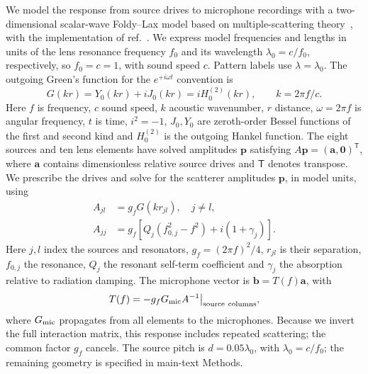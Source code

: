 \documentclass[pdflatex,sn-nature]{sn-jnl}%
\begin{document}
We model the response from source drives to microphone recordings with a two-dimensional scalar-wave Foldy--Lax model based on multiple-scattering theory~\cite{foldy1945,lax1951}, with the implementation of ref.~\cite{orazbayev2020}.
We express model frequencies and lengths in units of the lens resonance frequency
$f_0$ and its wavelength $\lambda_0=c/f_0$, respectively, so $f_0=c=1$, with sound speed $c$. Pattern labels use $\lambda=\lambda_0$. The outgoing Green's
function for the $e^{+i\omega t}$ convention is
\begin{equation}
 G(kr)=Y_0(kr)+iJ_0(kr)=iH_0^{(2)}(kr),\qquad k=2\pi f/c.
 \label{eq:green}
\end{equation}
Here $f$ is frequency, $c$ sound speed, $k$ acoustic wavenumber, $r$ distance,
$\omega=2\pi f$ is angular frequency, $t$ is time, $i^2=-1$, $J_0,Y_0$ are zeroth-order Bessel functions of the first and second kind and $H_0^{(2)}$
is the outgoing Hankel function. The eight sources and ten lens
elements have solved amplitudes $\bm p$ satisfying
$A\bm p=(\bm a,\bm0)^{\mathsf T}$, where $\bm a$ contains dimensionless
relative source drives and $\mathsf T$ denotes transpose. We prescribe the drives and solve for the scatterer amplitudes $\bm p$, in model units, using
\begin{equation}
 \begin{aligned}
 A_{jl}&=g_fG(kr_{jl}),\quad j\ne l,\\
 A_{jj}&=g_f[Q_j(f_{0,j}^2-f^2)+i(1+\gamma_j)].
 \end{aligned}
 \label{eq:foldylax}
\end{equation}
Here $j,l$ index the sources and resonators, $g_f=(2\pi f)^2/4$, $r_{jl}$ is their separation, $f_{0,j}$ the
resonance, $Q_j$ the resonant self-term coefficient and $\gamma_j$ the
absorption relative to radiation damping. The microphone vector is
$\bm b=T(f)\bm a$, with
\begin{equation}
 T(f)=-g_fG_{\rm mic}A^{-1}\big|_{\rm source\ columns},
 \label{eq:Tcd}
\end{equation}
where $G_{\rm mic}$ propagates from all elements to the microphones.
Because we invert the full interaction matrix, this response includes repeated scattering; the common factor $g_f$ cancels.
The source pitch is $d=0.05\lambda_0$, with $\lambda_0=c/f_0$;
the remaining geometry is specified in main-text Methods.
\end{document}
